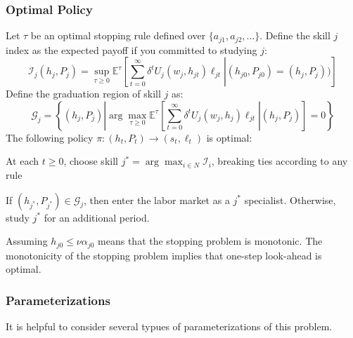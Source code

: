 \documentclass[10 pt]{article}
\newcommand{\gen}[1]{#1}
\newcommand{\gen}[1]{}
\newcommand{\ce}[2]{\left[\left. #1 \right\vert #2 \right]}
\begin{document}
\subsubsection{Optimal Policy}

Let $\tau$ be an optimal stopping rule defined over $\{ a_{j1}, a_{j2}, \dots \}$. 
Define the skill $j$ index as the expected payoff if you committed to studying $j$:
\begin{equation}\label{idx}
\mathcal{I}_j (h_j, P_j) = \sup_{\tau \geq 0} \mathbb{E}^\tau
\ce{
   \sum_{t=0}^\infty \delta^t U_j (w_j, h_{jt}) \ell_{jt}}
   {(h_{j0}, P_{j0}) = (h_j, P_j))
}
\end{equation}
Define the graduation region of skill $j$ as: 
\begin{equation}\label{grad}
\mathcal{G}_j = \left\{ (h_j, P_j) \left\vert
   \arg \max_{\tau \geq 0} 
   \mathbb{E}^\tau \ce{\sum_{t=0}^\infty \delta^t U_j (w_j, h_j) \ell_{jt}}
   {(h_j, P_j)} = 0
   \right. \right\}
\end{equation}
The following policy $\pi: (h_t, P_t) \to (s_t, \ell_t)$ is optimal: 
\begin{outline}
	\item At each $t \geq 0$, choose skill $j^* = \arg \max_{i \in N} \mathcal{I}_i$, breaking ties according to any rule
	\item If $(h_{j^*}, P_{j^*}) \in \mathcal{G}_{j}$, then enter the labor market as a $j^*$ specialist. Otherwise, study $j^*$ for an additional period.  
\end{outline}
Assuming $h_{j0} \leq \nu \alpha_{j0}$ means that the stopping problem is monotonic.
The monotonicity of the stopping problem implies that one-step look-ahead is optimal.

\subsubsection{Parameterizations}

It is helpful to consider several typues of parameterizations of this problem. 
\end{document}
